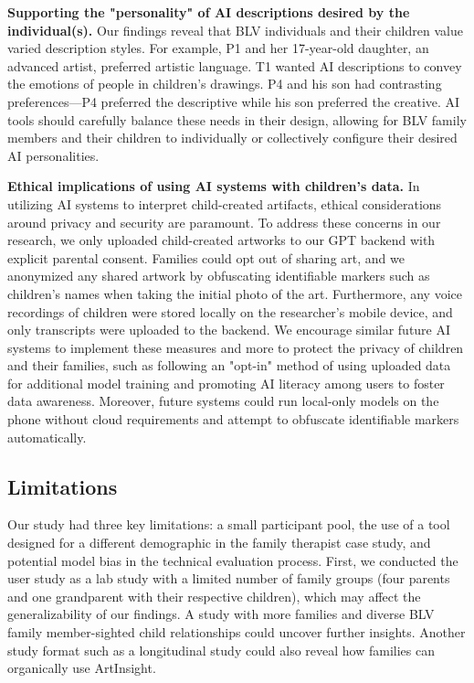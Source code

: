 \documentclass[sigconf]{acmart}
\begin{document}
\textbf{Supporting the "personality" of AI descriptions desired by the individual(s).} Our findings reveal that BLV individuals and their children value varied description styles. For example, P1 and her 17-year-old daughter, an advanced artist, preferred artistic language. T1 wanted AI descriptions to convey the emotions of people in children's drawings. P4 and his son had contrasting preferences---P4 preferred the descriptive while his son preferred the creative. AI tools should carefully balance these needs in their design, allowing for BLV family members and their children to individually or collectively configure their desired AI personalities.

\textbf{Ethical implications of using AI systems with children's data.} In utilizing AI systems to interpret child-created artifacts, ethical considerations around privacy and security are paramount. To address these concerns in our research, we only uploaded child-created artworks to our GPT backend with explicit parental consent. Families could opt out of sharing art, and we anonymized any shared artwork by obfuscating identifiable markers such as children's names when taking the initial photo of the art. Furthermore, any voice recordings of children were stored locally on the researcher's mobile device, and only transcripts were uploaded to the backend. We encourage similar future AI systems to implement these measures and more to protect the privacy of children and their families, such as following an "opt-in" method of using uploaded data for additional model training and promoting AI literacy among users to foster data awareness. Moreover, future systems could run local-only models on the phone without cloud requirements and attempt to obfuscate identifiable markers automatically.

\subsection{Limitations}
Our study had three key limitations: a small participant pool, the use of a tool designed for a different demographic in the family therapist case study, and potential model bias in the technical evaluation process. First, we conducted the user study as a lab study with a limited number of family groups (four parents and one grandparent with their respective children), which may affect the generalizability of our findings. A study with more families and diverse BLV family member-sighted child relationships could uncover further insights. Another study format such as a longitudinal study could also reveal how families can organically use ArtInsight.
\end{document}
